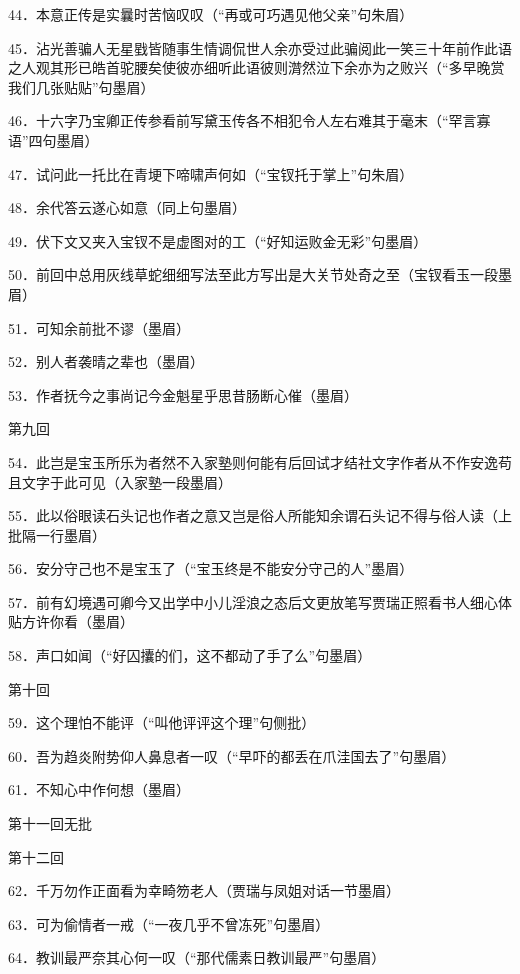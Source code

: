 44．本意正传是实曩时苦恼叹叹{（\kaishu “再或可巧遇见他父亲”句朱眉）}

45．沾光善骗人无星戥皆随事生情调侃世人余亦受过此骗阅此一笑三十年前作此语之人观其形已皓首驼腰矣使彼亦细听此语彼则潸然泣下余亦为之败兴{（\kaishu “多早晚赏我们几张贴贴”句墨眉）}

46．十六字乃宝卿正传参看前写黛玉传各不相犯令人左右难其于毫末{（\kaishu “罕言寡语”四句墨眉）}

47．试问此一托比在青埂下啼啸声何如{（\kaishu “宝钗托于掌上”句朱眉）}

48．余代答云遂心如意{（\kaishu 同上句墨眉）}

49．伏下文又夹入宝钗不是虚图对的工{（\kaishu “好知运败金无彩”句墨眉）}

50．前回中总用灰线草蛇细细写法至此方写出是大关节处奇之至{（\kaishu 宝钗看玉一段墨眉）}

51．可知余前批不谬{（\kaishu 墨眉）}

52．别人者袭晴之辈也{（\kaishu 墨眉）}

53．作者抚今之事尚记今金魁星乎思昔肠断心催{（\kaishu 墨眉）}

第九回

54．此岂是宝玉所乐为者然不入家塾则何能有后回试才结社文字作者从不作安逸苟且文字于此可见{（\kaishu 入家塾一段墨眉）}

55．此以俗眼读石头记也作者之意又岂是俗人所能知余谓石头记不得与俗人读{（\kaishu 上批隔一行墨眉）}

56．安分守己也不是宝玉了{（\kaishu “宝玉终是不能安分守己的人”墨眉）}

57．前有幻境遇可卿今又出学中小儿淫浪之态后文更放笔写贾瑞正照看书人细心体贴方许你看{（\kaishu 墨眉）}

58．声口如闻{（\kaishu “好囚攮的们，这不都动了手了么”句墨眉）}

第十回

59．这个理怕不能评{（\kaishu “叫他评评这个理”句侧批）}

60．吾为趋炎附势仰人鼻息者一叹{（\kaishu “早吓的都丢在爪洼国去了”句墨眉）}

61．不知心中作何想{（\kaishu 墨眉）}

第十一回无批

第十二回

62．千万勿作正面看为幸畸笏老人{（\kaishu 贾瑞与凤姐对话一节墨眉）}

63．可为偷情者一戒{（\kaishu “一夜几乎不曾冻死”句墨眉）}

64．教训最严奈其心何一叹{（\kaishu “那代儒素日教训最严”句墨眉）}


